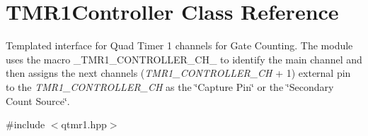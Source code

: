 \hypertarget{classTMR1Controller}{}\section{T\+M\+R1\+Controller Class Reference}
\label{classTMR1Controller}


Templated interface for Quad Timer 1 channels for Gate Counting. The module uses the macro {\ttfamily \+\_\+\+T\+M\+R1\+\_\+\+C\+O\+N\+T\+R\+O\+L\+L\+E\+R\+\_\+\+C\+H\+\_\+} to identify the main channel and then assigns the next channel\textquotesingle{}s ({\itshape T\+M\+R1\+\_\+\+C\+O\+N\+T\+R\+O\+L\+L\+E\+R\+\_\+\+CH} + 1) external pin to the {\itshape T\+M\+R1\+\_\+\+C\+O\+N\+T\+R\+O\+L\+L\+E\+R\+\_\+\+CH} as the \char`\"{}\+Capture Pin\char`\"{} or the \char`\"{}\+Secondary Count Source\char`\"{}.  




{\ttfamily \#include $<$qtmr1.\+hpp$>$}

